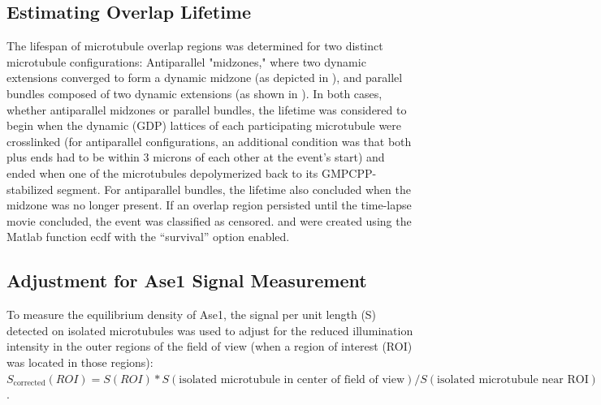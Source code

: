 \subsection{Estimating Overlap Lifetime}
The lifespan of microtubule overlap regions was determined for two distinct microtubule configurations: Antiparallel "midzones," where two dynamic extensions converged to form a dynamic midzone (as depicted in ), and parallel bundles composed of two dynamic extensions (as shown in ). In both cases, whether antiparallel midzones or parallel bundles, the lifetime was considered to begin when the dynamic (GDP) lattices of each participating microtubule were crosslinked (for antiparallel configurations, an additional condition was that both plus ends had to be within 3 microns of each other at the event's start) and ended when one of the microtubules depolymerized back to its GMPCPP-stabilized segment. For antiparallel bundles, the lifetime also concluded when the midzone was no longer present. If an overlap region persisted until the time-lapse movie concluded, the event was classified as censored.  and  were created using the Matlab function ecdf with the “survival” option enabled.

\subsection{Adjustment for Ase1 Signal Measurement}
To measure the equilibrium density of Ase1, the signal per unit length (S) detected on isolated microtubules was used to adjust for the reduced illumination intensity in the outer regions of the field of view (when a region of interest (ROI) was located in those regions): $S_{\textrm{corrected}}(ROI) = S(ROI) * S(\textrm{isolated microtubule in center of field of view}) / S(\textrm{isolated microtubule near ROI})$.

